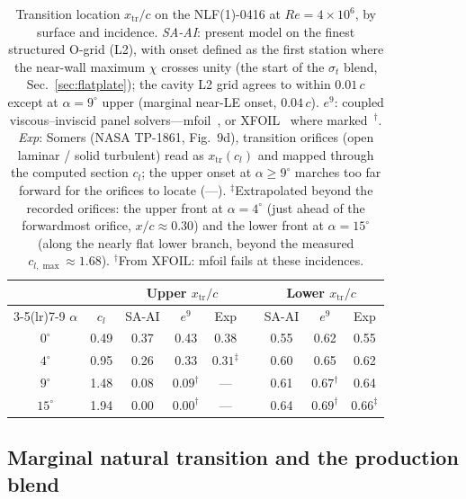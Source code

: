 \documentclass[journal]{new-aiaa}
\begin{document}
\begin{table}[tp]
  \centering
  \small
  \caption{Transition location $x_\mathrm{tr}/c$ on the NLF(1)-0416 at
  $Re\!=\!4\!\times\!10^6$, by surface and incidence. \emph{SA-AI}: present
  model on the finest structured O-grid (L2), with onset defined as the first
  station where the near-wall maximum $\chi$ crosses unity (the start of the
  $\sigma_t$ blend, Sec.~\ref{sec:flatplate}); the cavity
  L2 grid agrees to within $0.01\,c$ except at $\alpha\!=\!9^\circ$ upper
  (marginal near-LE onset, $0.04\,c$). \emph{$e^9$}: coupled viscous--inviscid
  panel solvers---mfoil~\cite{fidkowski_mfoil_2022}, or
  XFOIL~\cite{drela_xfoil_1989} where marked~$^\dagger$. \emph{Exp}: Somers
  (NASA TP-1861, Fig.~9d), transition orifices (open laminar / solid turbulent)
  read as $x_\mathrm{tr}(c_l)$ and mapped through the computed section $c_l$; the
  upper onset at $\alpha\!\geq\!9^\circ$ marches too far forward for the orifices
  to locate (---). $^\ddagger$Extrapolated beyond the recorded orifices: the
  upper front at $\alpha\!=\!4^\circ$ (just ahead of the forwardmost orifice,
  $x/c\!\approx\!0.30$) and the lower front at $\alpha\!=\!15^\circ$ (along the
  nearly flat lower branch, beyond the measured $c_{l,\max}\!\approx\!1.68$).
  $^\dagger$From XFOIL: mfoil fails at these incidences.}
  \label{tab:nlftrans}
  \begin{tabular}{cc ccc c ccc}
    \toprule
    & & \multicolumn{3}{c}{Upper $x_\mathrm{tr}/c$} & & \multicolumn{3}{c}{Lower $x_\mathrm{tr}/c$}\\
    \cmidrule(lr){3-5}\cmidrule(lr){7-9}
    $\alpha$ & $c_l$ & SA-AI & $e^9$ & Exp & & SA-AI & $e^9$ & Exp \\
    \midrule
    $0^\circ$  & 0.49 & 0.37 & 0.43 & 0.38 & & 0.55 & 0.62 & 0.55 \\
    $4^\circ$  & 0.95 & 0.26 & 0.33 & $0.31^\ddagger$ & & 0.60 & 0.65 & 0.62 \\
    $9^\circ$  & 1.48 & 0.08 & $0.09^\dagger$ & ---  & & 0.61 & $0.67^\dagger$ & 0.64 \\
    $15^\circ$ & 1.94 & 0.00 & $0.00^\dagger$ & ---  & & 0.64 & $0.69^\dagger$ & $0.66^\ddagger$ \\
    \bottomrule
  \end{tabular}
\end{table}

\subsection{Marginal natural transition and the production blend}\label{sec:blendnlf}
\end{document}
